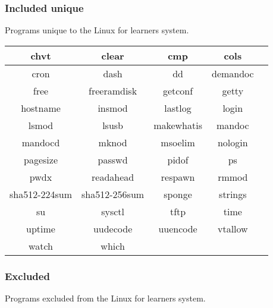\newpage

\subsubsection{Included unique}

Programs unique to the Linux for learners system.

\begin{center}
    \begin{tabular}{|c|c|c|c|c|}
        \hline
        chvt & clear & cmp & cols \\
        \hline
        cron & dash & dd & demandoc \\
        \hline
        free & freeramdisk & getconf & getty \\
        \hline
        hostname & insmod & lastlog & login \\
        \hline
        lsmod & lsusb & makewhatis & mandoc \\
        \hline
        mandocd & mknod & msoelim & nologin \\
        \hline
        pagesize & passwd & pidof & ps \\
        \hline
        pwdx & readahead & respawn & rmmod \\
        \hline
        sha512-224sum & sha512-256sum & sponge & strings \\
        \hline
        su & sysctl & tftp & time \\
        \hline
        uptime & uudecode & uuencode & vtallow \\
        \hline
        watch & which \\
        \cline{1-2}
    \end{tabular}
\end{center}

\newpage

\subsubsection{Excluded}

Programs excluded from the Linux for learners system.

